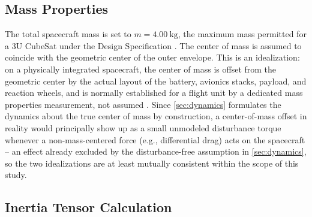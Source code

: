 \subsection{Mass Properties}
\label{sec:mass_props}

The total spacecraft mass is set to $m = \SI{4.00}{\kilo\gram}$, the maximum mass permitted for a 3U CubeSat under the Design Specification \cite{cubesatspec2022}. The center of mass is assumed to coincide with the geometric center of the outer envelope. This is an idealization: on a physically integrated spacecraft, the center of mass is offset from the geometric center by the actual layout of the battery, avionics stacks, payload, and reaction wheels, and is normally established for a flight unit by a dedicated mass properties measurement, not assumed \cite{wertz1978}. Since \cref{sec:dynamics} formulates the dynamics about the true center of mass by construction, a center-of-mass offset in reality would principally show up as a small unmodeled disturbance torque whenever a non-mass-centered force (e.g., differential drag) acts on the spacecraft -- an effect already excluded by the disturbance-free assumption in \cref{sec:dynamics}, so the two idealizations are at least mutually consistent within the scope of this study.

\subsection{Inertia Tensor Calculation}
\label{sec:inertia_calc}

